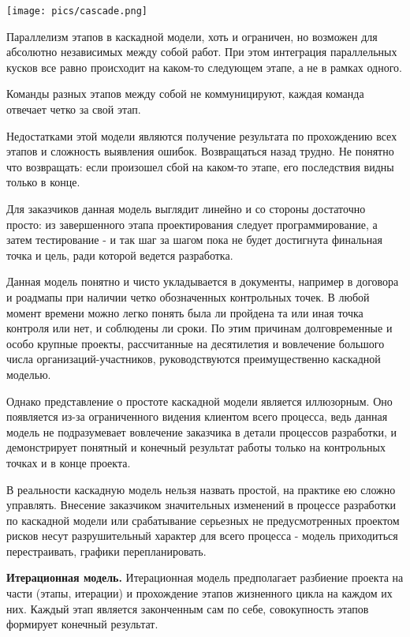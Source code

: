 \texttt{[image: pics/cascade.png]}

Параллелизм этапов в каскадной модели, хоть и ограничен, но возможен для абсолютно независимых между собой работ. При этом интеграция параллельных кусков все равно происходит на каком-то следующем этапе, а не в рамках одного.

Команды разных этапов между собой не коммуницируют, каждая команда отвечает четко за свой этап.

Недостатками этой модели являются получение результата  по прохождению всех этапов и сложность выявления ошибок. Возвращаться назад трудно. Не понятно что возвращать: если произошел сбой на каком-то этапе, его последствия видны только в конце. 

Для заказчиков данная модель выглядит линейно и со стороны достаточно просто: из завершенного этапа проектирования следует программирование, а затем тестирование - и так шаг за шагом пока не будет достигнута финальная точка и цель, ради которой ведется разработка. 

Данная модель понятно и чисто укладывается в документы, например в договора и роадмапы при наличии четко обозначенных контрольных точек. В любой момент времени можно легко понять была ли пройдена та или иная точка контроля или нет, и соблюдены ли сроки. По этим причинам долговременные и особо крупные проекты, рассчитанные на десятилетия и вовлечение большого числа организаций-участников, руководствуются преимущественно каскадной моделью. 

Однако представление о простоте каскадной модели является иллюзорным. Оно появляется из-за ограниченного видения клиентом всего процесса, ведь данная модель не подразумевает вовлечение заказчика в детали процессов разработки, и демонстрирует понятный и конечный результат работы только на контрольных точках и в конце проекта. 

В реальности каскадную модель нельзя назвать простой, на практике ею сложно управлять.  Внесение заказчиком значительных изменений в процессе разработки по каскадной модели или срабатывание серьезных не предусмотренных проектом рисков несут разрушительный характер для всего процесса - модель приходиться перестраивать, графики перепланировать. 

\textbf{Итерационная модель.} Итерационная модель предполагает разбиение проекта на части (этапы, итерации) и прохождение этапов жизненного цикла на каждом их них. Каждый этап является законченным сам по себе, совокупность этапов формирует конечный результат.


